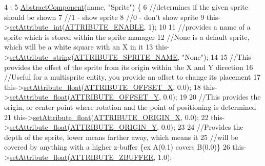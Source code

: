 \begin{DoxyCode}
4                                                : 
5     \hyperlink{class_abstract_component_ab08b845eddbdbe411b95a5385501ab97}{AbstractComponent}(name, \textcolor{stringliteral}{"Sprite"}) \{
6     \textcolor{comment}{//determines if the given sprite should be shown}
7         \textcolor{comment}{//1 - show sprite}
8         \textcolor{comment}{//0 - don't show sprite}
9     this->\hyperlink{class_abstract_component_aca84c14d196467bda6aff90521b1ae7f}{setAttribute\_int}(\hyperlink{_a_e___attributes_8h_a4c775095baf8a9c99621ad9ad3b622db}{ATTRIBUTE\_ENABLE}, 1);
10 
11     \textcolor{comment}{//provides a name of a sprite which is stored within the sprite manager}
12         \textcolor{comment}{//None is a default sprite, which will be a white square with an X in it}
13     this->\hyperlink{class_abstract_component_a702ec2cc2624561ef51afcd9c8061fd2}{setAttribute\_string}(\hyperlink{_a_e___attributes_8h_a374d6a23ea1ee16468fa4f002bef492f}{ATTRIBUTE\_SPRITE\_NAME}, \textcolor{stringliteral}{"None"});
14 
15     \textcolor{comment}{//This provides the offset of the sprite from its origin within the X and Y direction}
16         \textcolor{comment}{//Useful for a multisprite entity, you provide an offset to change its placement}
17     this->\hyperlink{class_abstract_component_aadaf9dfbb371db5fb21f9c7cf2cbea98}{setAttribute\_float}(\hyperlink{_a_e___attributes_8h_aa003b6ad3f43053c9d43e1acc0098691}{ATTRIBUTE\_OFFSET\_X}, 0.0);
18     this->\hyperlink{class_abstract_component_aadaf9dfbb371db5fb21f9c7cf2cbea98}{setAttribute\_float}(\hyperlink{_a_e___attributes_8h_a8ebf91b8ee9dfdfad18bc10c3c42d564}{ATTRIBUTE\_OFFSET\_Y}, 0.0);
19 
20     \textcolor{comment}{//This provides the origin, or center point where rotation and the point of positioning is determined}
21     this->\hyperlink{class_abstract_component_aadaf9dfbb371db5fb21f9c7cf2cbea98}{setAttribute\_float}(\hyperlink{_a_e___attributes_8h_a5c5a5ae3ea4130db3dfd08029a17a17c}{ATTRIBUTE\_ORIGIN\_X}, 0.0);
22     this->\hyperlink{class_abstract_component_aadaf9dfbb371db5fb21f9c7cf2cbea98}{setAttribute\_float}(\hyperlink{_a_e___attributes_8h_af45315d7cdc2f4ecdb28d0a9d6bb15c7}{ATTRIBUTE\_ORIGIN\_Y}, 0.0);
23 
24     \textcolor{comment}{//Provides the depth of the sprite, lower means farther away, which means it}
25         \textcolor{comment}{//will be covered by anything with a higher z-buffer \{ex A(0.1) covers B(0.0)\}}
26     this->\hyperlink{class_abstract_component_aadaf9dfbb371db5fb21f9c7cf2cbea98}{setAttribute\_float}(\hyperlink{_a_e___attributes_8h_af11539bb711833d6321aaccd369e9e4b}{ATTRIBUTE\_ZBUFFER}, 1.0);

\end{DoxyCode}
